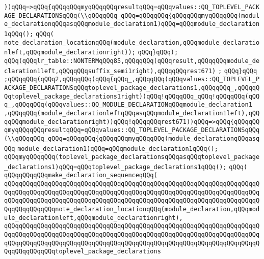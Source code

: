 \verb|))qQQq=>qQQq{qQQqqQQqmyqQQqqQQqresultqQQq=qQQqvalues::QQ_TOPLEVEL_PACKAGE_DECLARATIONSqQQq(\\qQQqqQQq_qQQq=qQQqqQQq{qQQqqQQqmyqQQqqQQq(module_declarationqQQqasqQQqmodule_declaration1)qQQq=qQQqmodule_declaration1qQQq();|\newline
\verb|qQQq(|\newline
\verb|note_declaration_locationqQQq(module_declaration,qQQqmodule_declarationleft,qQQqmodule_declarationright));|\newline
\verb|qQQq}qQQq);|\newline
\verb|qQQq(qQQqlr_table::NONTERMqQQq85,qQQqqQQq(qQQqresult,qQQqqQQqmodule_declaration1left,qQQqqQQqsuffix_semi1right),qQQqqQQqrest671)|\newline
\verb|;|\newline
\verb|qQQq}qQQq|\newline
\verb|;qQQqqQQq(qQQq2,qQQqqQQq(qQQq(qQQq_,qQQqqQQq(qQQqvalues::QQ_TOPLEVEL_PACKAGE_DECLARATIONSqQQqtoplevel_package_declarations1,qQQqqQQq_,qQQqqQQqtoplevel_package_declarations1right))qQQq!qQQqqQQq_qQQq!qQQqqQQq(qQQq_,qQQqqQQq(qQQqvalues::QQ_MODULE_DECLARATIONqQQqmodule_declaration1|\newline
\verb|,qQQqqQQq(module_declarationleftqQQqasqQQqmodule_declaration1left),qQQqqQQqmodule_declarationright))qQQq!qQQqqQQqrest671))qQQq=>qQQq{qQQqqQQqmyqQQqqQQqresultqQQq=qQQqvalues::QQ_TOPLEVEL_PACKAGE_DECLARATIONSqQQq(\\qQQqqQQq_qQQq=qQQqqQQq{qQQqqQQqmyqQQqqQQq(module_declarationqQQqasqQQq|\newline
\verb|module_declaration1)qQQq=qQQqmodule_declaration1qQQq();|\newline
\verb|qQQqmyqQQqqQQq(toplevel_package_declarationsqQQqasqQQqtoplevel_package_declarations1)qQQq=qQQqtoplevel_package_declarations1qQQq();|\newline
\verb|qQQq(|\newline
\verb|qQQqqQQqqQQqmake_declaration_sequenceqQQq(|\newline
\verb|qQQqqQQqqQQqqQQqqQQqqQQqqQQqqQQqqQQqqQQqqQQqqQQqqQQqqQQqqQQqqQQqqQQqqQQqqQQqqQQqqQQqqQQqqQQqqQQqqQQqqQQqqQQqqQQqqQQqqQQqqQQqqQQqqQQqqQQqqQQqqQQqqQQqqQQqqQQqqQQqqQQqqQQqqQQqqQQqqQQqqQQqqQQqqQQqqQQqqQQqqQQqqQQqqQQqqQQqqQQqqQQqnote_declaration_locationqQQq(module_declaration,qQQqmodule_declarationleft,qQQqmodule_declarationright),|\newline
\verb|qQQqqQQqqQQqqQQqqQQqqQQqqQQqqQQqqQQqqQQqqQQqqQQqqQQqqQQqqQQqqQQqqQQqqQQqqQQqqQQqqQQqqQQqqQQqqQQqqQQqqQQqqQQqqQQqqQQqqQQqqQQqqQQqqQQqqQQqqQQqqQQqqQQqqQQqqQQqqQQqqQQqqQQqqQQqqQQqqQQqqQQqqQQqqQQqqQQqqQQqqQQqqQQqqQQqqQQqqQQqqQQqtoplevel_package_declarations|\newline
